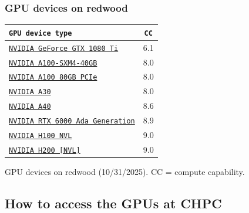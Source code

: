 \begin{frame}
  \frametitle{GPU devices on redwood}
  \begin{center}
    \small
    \begin{tabular}{l|c}
      \texttt{GPU device type} & \texttt{CC} \\
      \hline
      \href{https://www.nvidia.com/en-us/geforce/10-series/}{\texttt{NVIDIA GeForce GTX 1080 Ti}} & 6.1 \\
      \href{https://www.nvidia.com/content/dam/en-zz/Solutions/Data-Center/a100/pdf/nvidia-a100-datasheet-us-nvidia-1758950-r4-web.pdf}{\texttt{NVIDIA A100-SXM4-40GB}} & 8.0 \\
      \href{https://www.nvidia.com/content/dam/en-zz/Solutions/Data-Center/a100/pdf/nvidia-a100-datasheet-us-nvidia-1758950-r4-web.pdf}{\texttt{NVIDIA A100 80GB PCIe}} & 8.0 \\
      \href{https://www.nvidia.com/content/dam/en-zz/Solutions/data-center/products/a30-gpu/pdf/a30-datasheet.pdf}{\texttt{NVIDIA A30}} & 8.0 \\
      \href{https://images.nvidia.com/content/Solutions/data-center/a40/nvidia-a40-datasheet.pdf}{\texttt{NVIDIA A40}} & 8.6 \\
      \href{https://www.nvidia.com/content/dam/en-zz/Solutions/design-visualization/rtx-6000/proviz-print-rtx6000-datasheet-web-2504660.pdf}{\texttt{NVIDIA RTX 6000 Ada Generation}} & 8.9 \\
      \href{https://www.nvidia.com/en-us/data-center/h100/}{\texttt{NVIDIA H100 NVL}} & 9.0 \\
      \href{https://www.nvidia.com/en-us/data-center/h200/}{\texttt{NVIDIA H200 [NVL]}} & 9.0 \\
      \hline
    \end{tabular}
  \end{center}
  \par\small{GPU devices on redwood (10/31/2025). CC = compute capability.}
\end{frame}

\subsection{How to access the GPUs at CHPC}

